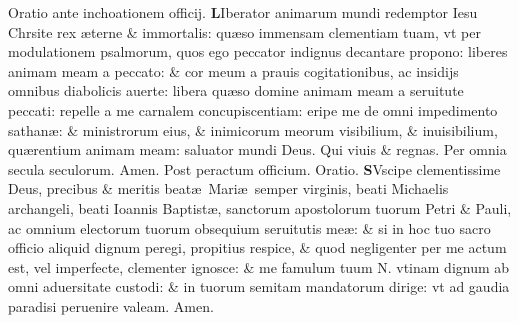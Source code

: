 \documentclass[a5paper,10pt]{book}
\def\ae{æ}
\begin{document}
\begin{multicols}{2}
\color{red} Oratio ante inchoationem officij. \color{black}
\lettrine[lines=2]{\color{red} \bfseries L}{}Iberator animarum mundi redemptor Iesu Chrsite rex \ae terne \& immortalis:
qu\ae so immensam clementiam tuam, vt per modulationem psalmorum, quos ego peccator indignus decantare propono:
liberes animam meam a peccato:
\& cor meum a prauis cogitationibus, ac insidijs %
omnibus diabolicis auerte:
libera qu\ae so domine animam meam a seruitute peccati:
repelle a me carnalem concupiscentiam:
eripe me de omni impedimento sathan\ae :
\& ministrorum eius, \& inimicorum meorum visibilium, \& inuisibilium, qu\ae rentium animam meam:
saluator mundi Deus. Qui viuis \& regnas. Per omnia secula seculorum. Amen.
\newline \color{red} Post peractum officium. Oratio. \color{black}
\lettrine[lines=2]{\color{red} \bfseries S}{}Vscipe clementissime Deus, precibus \& meritis beat\ae \ Mari\ae \ semper virginis, beati Michaelis archangeli, beati Ioannis Baptist\ae , sanctorum apostolorum tuorum Petri \& Pauli, ac omnium electorum tuorum obsequium seruitutis me\ae :
\& si in hoc tuo sacro officio aliquid dignum peregi, propitius respice, \& quod negligenter per me actum est, vel imperfecte, clementer ignosce:
\& me famulum tuum N. vtinam dignum ab omni aduersitate %
custodi:
\& in tuorum semitam mandatorum dirige:
vt ad gaudia paradisi peruenire valeam. Amen.
\end{multicols}
\end{document}

